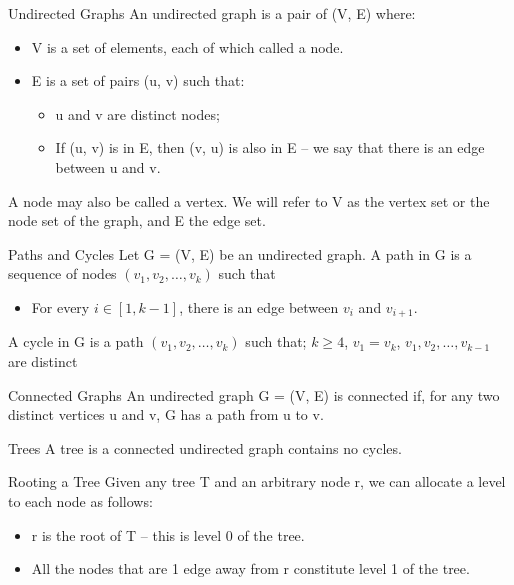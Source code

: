 \documentclass{lecture}
\begin{document}
\begin{landscape}
\begin{multicols}{2}
    \begin{note}{Undirected Graphs}
        An undirected graph is a pair of (V, E) where:
        \begin{itemize}
            \item V is a set of elements, each of which called a node.
            \item E is a set of pairs (u, v) such that:
                \begin{itemize}
                    \item u and v are distinct nodes;
                    \item If (u, v) is in E, then (v, u) is also in E -- we say that there is an edge between u and v.
                \end{itemize}
        \end{itemize}
        A node may also be called a vertex. We will refer to V as the vertex set or the node set of the graph, and E the edge set.
    \end{note}
    \vfill
    \begin{note}{Paths and Cycles}
        Let G = (V, E) be an undirected graph. A path in G is a sequence of nodes $(v_1, v_2, \ldots, v_k)$ such that
        \begin{itemize}
            \item For every $i\in [1, k-1]$, there is an edge between $v_i$ and $v_{i+1}$.
        \end{itemize}
        A cycle in G is a path $(v_1, v_2, \ldots, v_k)$ such that; $k\geq 4$, $v_1 = v_k$, $v_1, v_2, \ldots, v_{k-1}$ are distinct
    \end{note}
    \vfill
    \begin{note}{Connected Graphs}
        An undirected graph G = (V, E) is connected if, for any two distinct vertices u and v, G has a path from u to v.
    \end{note}
    \vfill
    \begin{note}{Trees}
        A tree is a connected undirected graph contains no cycles.
    \end{note}
    \vfill
    \begin{note}{Rooting a Tree}
        Given any tree T and an arbitrary node r, we can allocate a level to each node as follows:
        \begin{itemize}
            \item r is the root of T -- this is level 0 of the tree.
            \item All the nodes that are 1 edge away from r constitute level 1 of the tree.

\end{itemize}
\end{note}
\end{multicols}
\end{landscape}
\end{document}
